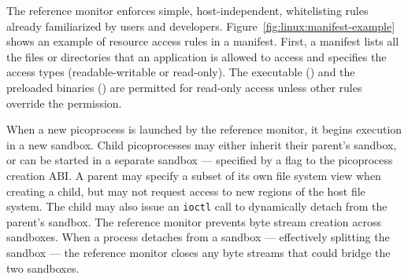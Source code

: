 The reference monitor enforces simple, host-independent, whitelisting rules
already familiarized by users and developers.
Figure~\ref{fig:linux:manifest-example} shows an example of resource access rules
in a manifest.
First, a manifest lists all the files or directories
that an application is allowed to access and specifies the access types (readable-writable or read-only).
The executable () and the preloaded \libos{} binaries () are permitted for read-only access unless other rules override the permission.




When a new picoprocess is launched by the reference monitor, it begins execution in 
a new sandbox.  
Child picoprocesses may either inherit their parent's sandbox, 
or can be started in a separate sandbox
--- specified by a flag to the picoprocess creation ABI.
A parent may specify a subset of its own file system view 
when creating a child, but may not request access to new regions of the 
host file system. 
The child may also issue an {\tt ioctl} call to 
dynamically detach from the parent's sandbox. The reference monitor prevents byte stream creation 
across sandboxes.
When a process detaches from a sandbox --- effectively splitting the sandbox ---
the reference monitor closes
any byte streams that could bridge the two sandboxes.


\begin{comment}
We hasten to note that program counter filtering
is only provided for backwards compatibility, not security.
An attacker can compromise the \pal{}, so system policies are enforced
externally by the reference monitor.


Dynamically redirecting system calls to {\tt libLinux} is 
less efficient than dynamically linking against
the \graphene{} libc or statically compiling {\tt libLinux} into the application.
The overhead of dynamic redirection comes from 
transferring control to the kernel, then back to 
the \pal{}, and then to {\tt libLinux}.
We leave exploration of more efficient alternatives for future work,
such as redirecting the hardware system call table to {\tt libLinux}
on a host system like Dune~\cite{belay12dune},
or dynamically rewriting parts of the static binary~\cite{hunt99detours}.
\end{comment}

